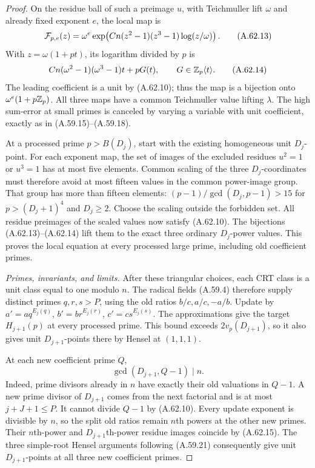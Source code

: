 \begin{proof}
On the residue ball of such a preimage $u$,
with Teichmuller lift $\omega$ and already
fixed exponent $e$, the local map is
\[
 {\cal F}_{p,e}(z)=\omega^e
       \exp\!\left(Cn(z^2-1)(z^3-1)
                                      \log(z/\omega)\right).
 \tag{A.62.13}
\]
With $z=\omega(1+pt)$, its logarithm divided
by $p$ is
\[
 Cn(\omega^2-1)(\omega^3-1)t+pG(t),
                            \qquad G\in\mathbb Z_p\langle t\rangle.
 \tag{A.62.14}
\]
The leading coefficient is a unit by
(A.62.10); thus the map is a bijection
onto $\omega^e(1+p\mathbb Z_p)$.
All three maps have a common Teichmuller
value lifting $\lambda$. The high
sum-error at small primes is canceled
by varying a variable with unit coefficient,
exactly as in (A.59.15)--(A.59.18).

At a processed prime $p>B(D_j)$, start
with the existing homogeneous unit
$D_j$-point. For each exponent map,
the set of images of the excluded residues
$u^2=1$ or $u^3=1$ has at most five
elements. Common scaling of the three
$D_j$-coordinates must therefore avoid
at most fifteen values in the common
power-image group.
That group has more than fifteen elements:
$(p-1)/\gcd(D_j,p-1)>15$ for
$p>(D_j+1)^4$ and $D_j\ge2$.
Choose the scaling outside the forbidden
set. All residue preimages of the scaled
values now satisfy (A.62.10).
The bijections (A.62.13)--(A.62.14)
lift them to the exact three ordinary
$D_j$-power values. This proves the
local equation at every processed large
prime, including old coefficient primes.

\emph{Primes, invariants, and limits.}
After these triangular choices, each
CRT class is a unit class equal to one
modulo $n$. The radical fields (A.59.4)
therefore supply distinct primes $q,r,s>P$,
using the old ratios $b/c,a/c,-a/b$.
Update by $a'=a q^{E_j(q)}$,
$b'=b r^{E_j(r)}$, $c'=c s^{E_j(s)}$.
The approximations give the target
$H_{j+1}(p)$ at every processed prime.
This bound exceeds $2v_p(D_{j+1})$,
so it also gives unit $D_{j+1}$-points
there by Hensel at $(1,1,1)$.

At each new coefficient prime $Q$,
\[
                      \gcd(D_{j+1},Q-1)\mid n.
 \tag{A.62.15}
\]
Indeed, prime divisors already in $n$
have exactly their old valuations in
$Q-1$. A new prime divisor of
$D_{j+1}$ comes from the next factorial
and is at most $j+J+1\le P$.
It cannot divide $Q-1$ by (A.62.10).
Every update exponent is divisible by
$n$, so the split old ratios remain
$n$th powers at the other new primes.
Their $n$th-power and $D_{j+1}$th-power
residue images coincide by (A.62.15).
The three simple-root Hensel arguments
following (A.59.21) consequently give
unit $D_{j+1}$-points at all three new
coefficient primes.


\end{proof}
